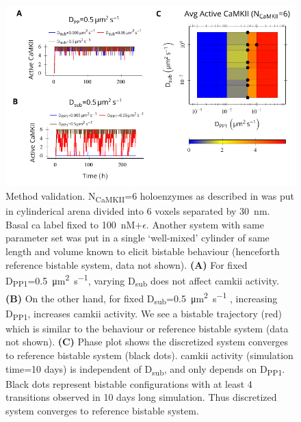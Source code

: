 \documentclass[9pt,lineno,doublespacing]{elife}
\newcommand\SUB[2]{#1\textsubscript{#2}}
\begin{document}
{\begin{figure}[ht!]
    \includegraphics[width=12cm]{./PaperFigures/elifeFigure7/figure_su_long_term_effect.pdf}
    \caption{Method validation. \SUB{N}{CaMKII}=6 holoenzymes as described in
         was put in cylinderical arena divided
        into 6 voxels separated by \SI{30}{\nano\meter}. Basal \gls{ca} label
        fixed to \SI{100}{\nano M}+$\epsilon$. Another system with same parameter set was put in a single
        `well-mixed' cylinder of same length and volume known to elicit bistable
        behaviour (henceforth reference bistable system, data not shown). 
        \textbf{(A)} For fixed \SUB{D}{PP1}=\SI{0.5}{\micro\meter\squared\per\second}, varying
        \SUB{D}{sub} does not affect \gls{camkii} activity. \textbf{(B)} On the
        other hand, for fixed
        \SUB{D}{sub}=\SI{0.5}{\micro\meter\squared\per\second} , increasing
        \SUB{D}{PP1}, increases \gls{camkii} activity. We see a bistable
        trajectory (red) which is similar to the behaviour or reference bistable
        system (data not shown). \textbf{(C)} Phase plot shows the discretized
        system converges to reference bistable system (black dots). \Gls{camkii}
        activity (simulation time=10 days) is independent of \SUB{D}{sub}, and
        only depends on \SUB{D}{PP1}.  Black dots represent bistable
        configurations with at least 4 transitions observed in 10 days long
        simulation. Thus discretized system converges to reference bistable system.
    }\label{fig:method_validation} 


\end{figure}}
\end{document}
